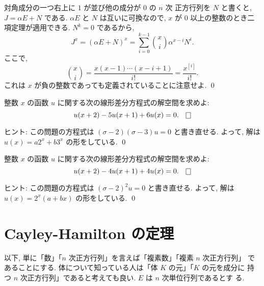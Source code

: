 \documentclass[12pt,twoside]{jarticle}
\begin{document}
対角成分の一つ右上に $1$ が並び他の成分が $0$ の $n$ 次
正方行列を $N$ と書くと, $J = \alpha E + N$ である. 
$\alpha E$ と $N$ は互いに可換なので, 
$x$ が $0$ 以上の整数のとき二項定理が適用できる. $N^k=0$ であるから,
\begin{equation*}
  J^x 
  = (\alpha E + N)^x 
  = \sum_{i=0}^{k-1} \binom{x}{i} \alpha^{x-i}N^i.
\end{equation*}
ここで,
\begin{equation*}
  \binom{x}{i} = \frac{x(x-1)\cdots(x-i+1)}{i!} = \frac{x^{[i]}}{i!}.
\end{equation*}
これは $x$ が負の整数であっても定義されていることに注意せよ.
\qed


\begin{question}[10点]
  整数 $x$ の函数 $u$ に関する次の線形差分方程式の解空間を求めよ:
  \begin{equation*}
    u(x+2) - 5 u(x+1) + 6 u(x) = 0.
  \qed
  \end{equation*}
\end{question}

\noindent
ヒント: この問題の方程式は $(\sigma-2)(\sigma-3)u = 0$ と書き直せる. 
よって, 解は $u(x) =  a 2^x + b 3^x$ の形をしている.
\qed


\begin{question}[10点]
  整数 $x$ の函数 $u$ に関する次の線形差分方程式の解空間を求めよ:
  \begin{equation*}
    u(x+2) - 4 u(x+1) + 4 u(x) = 0.
  \qed
  \end{equation*}
\end{question}

\noindent
ヒント: この問題の方程式は $(\sigma-2)^2 u = 0$ と書き直せる. よって,
解は $u(x) =  2^x(a + bx)$ の形をしている.
\qed


\section{Cayley-Hamilton の定理}
\label{sec:Cayley-Hamilton}

以下, 単に「数」「$n$ 次正方行列」を言えば「複素数」「複素 $n$ 次正方行列」
であることにする.  体について知っている人は「体 $K$ の元」「$K$ の元を成分に
持つ $n$ 次正方行列」であると考えても良い.  $E$ は $n$ 次単位行列であるとす
る. 
\end{document}

